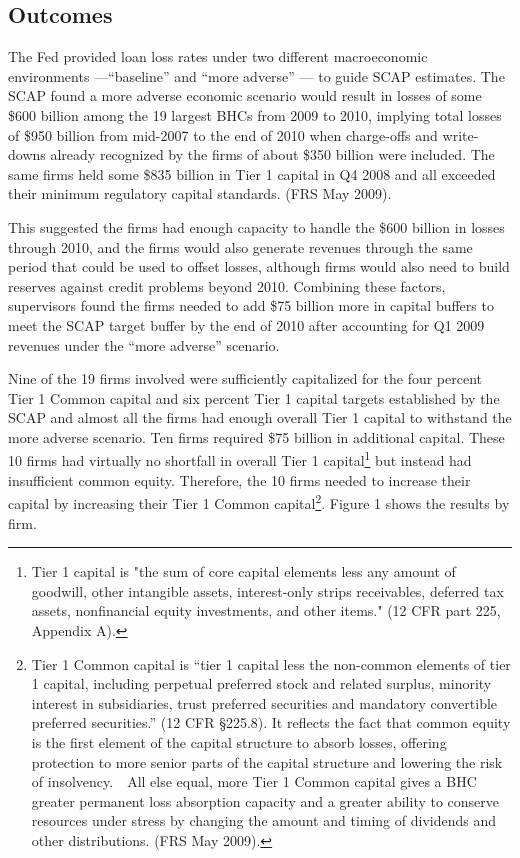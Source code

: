 \documentclass[justified, nobib]{tufte-handout2}
\begin{document}
\subsection{Outcomes}

The Fed provided loan loss rates under two different macroeconomic
environments ---``baseline'' and ``more adverse'' --- to guide SCAP
estimates. The SCAP found a more adverse economic scenario would result
in losses of some \$600 billion among the 19 largest BHCs from 2009 to
2010, implying total losses of \$950 billion from mid-2007 to the end of
2010 when charge-offs and write-downs already recognized by the firms of
about \$350 billion were included. The same firms held some \$835
billion in Tier 1 capital in Q4 2008 and all exceeded their minimum
regulatory capital standards. (FRS May 2009).

This suggested the firms had enough capacity to handle the \$600 billion
in losses through 2010, and the firms would also generate revenues
through the same period that could be used to offset losses, although
firms would also need to build reserves against credit problems beyond
2010. Combining these factors, supervisors found the firms needed to add
\$75 billion more in capital buffers to meet the SCAP target buffer by
the end of 2010 after accounting for Q1 2009 revenues under the ``more
adverse'' scenario.

Nine of the 19 firms involved were sufficiently capitalized for the four
percent Tier 1 Common capital and six percent Tier 1 capital targets
established by the SCAP and almost all the firms had enough overall Tier
1 capital to withstand the more adverse scenario. Ten firms required
\$75 billion in additional capital. These 10 firms had virtually no
shortfall in overall Tier 1 capital\footnote{Tier 1 capital is "the sum
  of core capital elements less any amount of goodwill, other intangible
  assets, interest-only strips receivables, deferred tax assets,
  nonfinancial equity investments, and other items." (12 CFR part 225,
  Appendix A).} but instead had insufficient common equity. Therefore,
the 10 firms needed to increase their capital by increasing their Tier 1
Common capital\footnote{Tier 1 Common capital is ``tier 1 capital less
  the non-common elements of tier 1 capital, including perpetual
  preferred stock and related surplus, minority interest in
  subsidiaries, trust preferred securities and mandatory convertible
  preferred securities.'' (12 CFR \S 225.8). It reflects the fact that
  common equity is the first element of the capital structure to absorb
  losses, offering protection to more senior parts of the capital
  structure and lowering the risk of insolvency.~~All else equal, more
  Tier 1 Common capital gives a BHC greater permanent loss absorption
  capacity and a greater ability to conserve resources under stress by
  changing the amount and timing of dividends and other distributions.
  (FRS May 2009).}. Figure 1 shows the results by firm.
\end{document}
